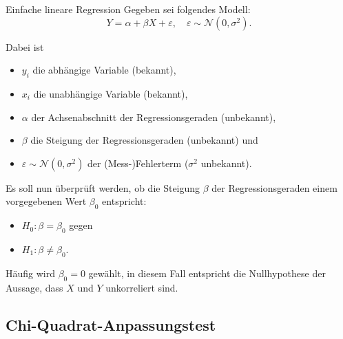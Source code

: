 \begin{defi}{Einfache lineare Regression}
    Gegeben sei folgendes Modell:
    \[
        Y = \alpha + \beta X + \varepsilon, \quad \varepsilon \sim \mathcal{N}(0, \sigma^2).
    \]

    Dabei ist
    \begin{itemize}
        \item $y_i$ die abhängige Variable (bekannt),
        \item $x_i$ die unabhängige Variable (bekannt),
        \item $\alpha$ der Achsenabschnitt der Regressionsgeraden (unbekannt),
        \item $\beta$ die Steigung der Regressionsgeraden (unbekannt) und
        \item $\varepsilon \sim \mathcal{N}(0, \sigma^2)$ der (Mess-)Fehlerterm ($\sigma^2$ unbekannt).
    \end{itemize}

    Es soll nun überprüft werden, ob die Steigung $\beta$ der Regressionsgeraden einem vorgegebenen Wert $\beta_0$ entspricht:
    \begin{itemize}
        \item $H_0: \beta = \beta_0$ gegen
        \item $H_1: \beta \neq \beta_0$.
    \end{itemize}

    Häufig wird $\beta_0 = 0$ gewählt, in diesem Fall entspricht die Nullhypothese der Aussage, dass $X$ und $Y$ unkorreliert sind.



\end{defi}

\subsection{Chi-Quadrat-Anpassungstest}
